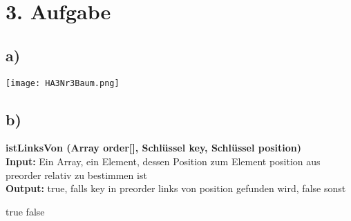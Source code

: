 \section*{3. Aufgabe}
\subsection*{a)}
\texttt{[image: HA3Nr3Baum.png]}
\subsection*{b)}
\textbf{istLinksVon (Array order[], Schlüssel key, Schlüssel position)}\\
\textbf{Input:} Ein Array, ein Element, dessen Position zum Element position aus preorder relativ zu bestimmen ist\\
\textbf{Output:} true, falls key in preorder links von position gefunden wird, false sonst
\begin{algorithmic}
\State \Return true
\EndIf
{}
\State \Return false
\EndIf
\EndFor
\end{algorithmic}
\newpage

